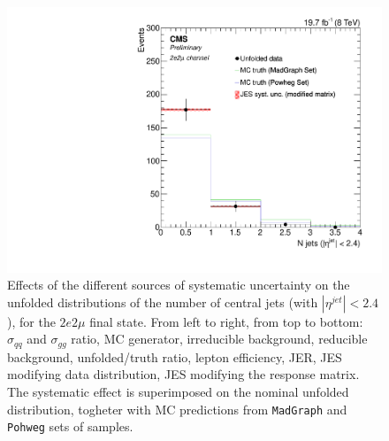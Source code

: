 \begin{figure}[hbtp]
\begin{center}
    \includegraphics[width=0.8\cmsFigWidth]{Figures/Unfolding/Systematics/ZZTo2e2m_CentralJets_JES_ModMat_Mad_fr}
    \caption{Effects of the different sources of systematic uncertainty on the unfolded distributions of the number of central jets (with $|\eta^{jet}|<2.4$), for the     
    $2e2\mu$ final state. From left to right, from top to bottom: $\sigma_{qq}$ and $\sigma_{gg}$ ratio, MC generator, irreducible background,
reducible background, unfolded/truth ratio, lepton efficiency, JER, JES modifying data distribution, JES modifying the response matrix. The systematic effect is superimposed on the nominal unfolded distribution, togheter with MC predictions from \texttt{MadGraph} and \texttt{Pohweg} sets of samples.}
    \label{fig:CentralJets_syst_2e2m}
  \end{center}
\end{figure}
\clearpage
